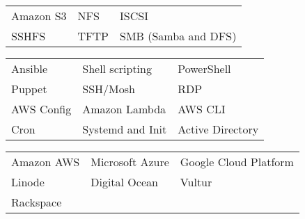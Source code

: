 \documentclass[a4paper,12pt]{memoir} %
\begin{document}

{\begin{tabular}{p{} p{} p{}}
	\bluebullet Amazon S3        & \bluebullet NFS               & \bluebullet ISCSI                  \\
	\bluebullet SSHFS            & \bluebullet TFTP              & \bluebullet SMB (Samba and DFS)    \\
\end{tabular}}


{\begin{tabular}{p{} p{} p{}}
	\bluebullet Ansible          & \bluebullet Shell scripting  & \bluebulet PowerShell               \\
	\bluebullet Puppet           & \bluebullet SSH/Mosh         & \bluebullet RDP                     \\
	\bluebullet AWS Config       & \bluebullet Amazon Lambda    & \bluebullet AWS CLI                 \\
	\bluebullet Cron             & \bluebullet Systemd and Init & \bluebullet Active Directory        \\
\end{tabular}}


\clearpage %

\userinformation %

\framebreak %


{\begin{tabular}{p{} p{} p{}}
	\bluebullet Amazon AWS       & \bluebullet Microsoft Azure  & \bluebullet Google Cloud Platform   \\
	\bluebullet Linode           & \bluebullet Digital Ocean    & \bluebullet Vultur                  \\
	\bluebullet Rackspace
\end{tabular}}
\end{document}
